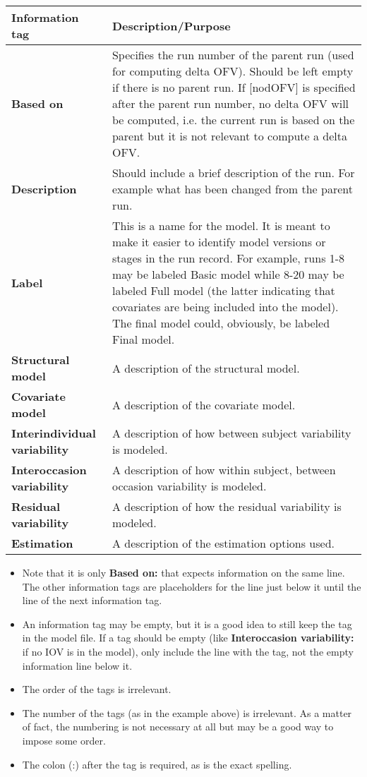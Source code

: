 \begin{longtable}{p{3cm}p{9.5cm}}
\hline
Information tag & Description/Purpose \\
\hline
\textbf{Based on} & Specifies the run number of the parent run (used for computing delta OFV). Should be left empty if there is no parent run. If [nodOFV] is specified after the parent run number, no delta OFV will be computed, i.e. the current run is based on the parent but it is not relevant to compute a delta OFV.\\
\hline
\textbf{Description} & Should include a brief description of the run. For example what has been changed from the parent run. \\
\hline
\textbf{Label} & This is a name for the model. It is meant to make it easier to identify model versions or stages in the run record. For example, runs 1-8 may be labeled Basic model while 8-20 may be labeled Full model (the latter indicating that covariates are being included into the model). The final model could, obviously, be labeled Final model. \\
\hline
\textbf{Structural model} & A description of the structural model. \\
\hline
\textbf{Covariate model} & A description of the covariate model. \\
\hline
\textbf{Interindividual variability} & A description of how between subject variability is modeled. \\
\hline
\textbf{Interoccasion variability} & A description of how within subject, between occasion variability is modeled. \\
\hline
\textbf{Residual variability} & A description of how the residual variability is modeled. \\
\hline
\textbf{Estimation} & A description of the estimation options used. \\
\hline
\end{longtable}

\begin{itemize}
\item Note that it is only \textbf{Based on:} that expects information on the same line. The other information tags are placeholders for the line just below it until the line of the next information tag.
\item An information tag may be empty, but it is a good idea to still keep the tag in the model file.  If a tag should be empty (like \textbf{Interoccasion variability:} if no IOV is in the model), only include the line with the tag, not the empty information line below it.
\item The order of the tags is irrelevant.
\item The number of the tags (as in the example above) is irrelevant. As a matter of fact, the numbering is not necessary at all but may be a good way to impose some order.
\item The colon (:) after the tag is required, as is the exact spelling.
\end{itemize}

